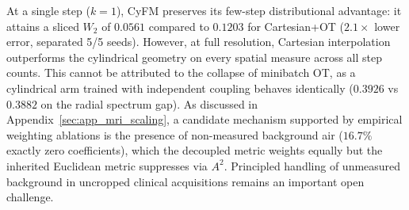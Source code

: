 At a single step ($k=1$), CyFM preserves its few-step distributional advantage: it attains a sliced $W_2$ of $0.0561$ compared to $0.1203$ for Cartesian+OT ($2.1\times$ lower error, separated 5/5 seeds). However, at full resolution, Cartesian interpolation outperforms the cylindrical geometry on every spatial measure across all step counts. This cannot be attributed to the collapse of minibatch OT, as a cylindrical arm trained with independent coupling behaves identically ($0.3926$ vs $0.3882$ on the radial spectrum gap). As discussed in Appendix~\ref{sec:app_mri_scaling}, a candidate mechanism supported by empirical weighting ablations is the presence of non-measured background air ($16.7\%$ exactly zero coefficients), which the decoupled metric weights equally but the inherited Euclidean metric suppresses via $A^2$. Principled handling of unmeasured background in uncropped clinical acquisitions remains an important open challenge.
